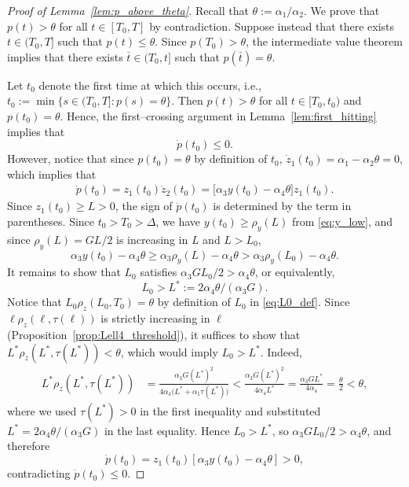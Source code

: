 \documentclass{article}
\begin{document}
\begin{proof}[Proof of Lemma~\ref{lem:p_above_theta}]
    Recall that $\theta:=\alpha_1/\alpha_2$. We prove that $p(t)>\theta$ for all $t\in[T_0,T]$
    by contradiction. Suppose instead that there exists $t\in(T_0,T]$ such that $p(t)\le\theta.$
    Since $p(T_0)>\theta$, the
    intermediate value theorem implies that there exists $\bar{t}\in(T_0,t]$ such that $p(\bar{t})=\theta$.
    
    Let $t_0$ denote the first time at which this occurs, i.e., $t_0:=\min\{s\in(T_0,T]:p(s)=\theta\}.$
    Then $p(t)>\theta$ for all $t\in[T_0,t_0)$ and $p(t_0)=\theta$. Hence, the first--crossing argument in Lemma~\ref{lem:first_hitting} implies that
    \begin{equation*}
        \dot p(t_0)\le 0.
    \end{equation*}
    However, notice that since $p(t_0)=\theta$ by definition of $t_0$, $\dot z_1(t_0)=\alpha_1-\alpha_2\theta=0$, which implies that 
    \begin{align*}
        \dot p(t_0) = z_1(t_0)\dot z_2(t_0) = \bigl[\alpha_3 y(t_0)-\alpha_4\theta\bigr]z_1(t_0).
    \end{align*}
    Since $z_1(t_0) \ge L > 0$, the sign of $\dot p(t_0)$ is determined by the term in parentheses. Since $t_0>T_0>\Delta$, we have $y(t_0)\ge\rho_y(L)$ from \eqref{eq:y_low}, and since $\rho_y(L)=GL/2$ is increasing in $L$ and $L>L_0$,
    \begin{equation*}
        \alpha_3 y(t_0)-\alpha_4\theta 
        \ge \alpha_3\rho_y(L)-\alpha_4\theta
        > \alpha_3\rho_y(L_0)-\alpha_4\theta.
    \end{equation*}
    It remains to show that $L_0$ satisfies $\alpha_3 GL_0/2>\alpha_4\theta$, 
    or equivalently, 
    \begin{equation*}
        L_0>L^*:=2\alpha_4\theta/(\alpha_3 G).
    \end{equation*}
    Notice that $L_0\rho_z(L_0,T_0) = \theta$
    by definition of $L_0$ in \eqref{eq:L0_def}. Since $\ell\rho_z(\ell,\tau(\ell))$ is strictly 
    increasing in $\ell$ (Proposition~\ref{prop:Lell4_threshold}), it suffices to show that
    $L^*\rho_z(L^*,\tau(L^*))<\theta$, which would imply $L_0>L^*$. Indeed,
    \begin{align*}
        L^*\rho_z(L^*,\tau(L^*))
        &= \frac{\alpha_3 G(L^*)^2}{4\alpha_4\bigl(L^*+\alpha_1\tau(L^*)\bigr)}
        < \frac{\alpha_3 G(L^*)^2}{4\alpha_4 L^*}
        = \frac{\alpha_3 G L^*}{4\alpha_4}
        = \frac{\theta}{2}
        < \theta,
    \end{align*}
    where we used $\tau(L^*)>0$ in the first inequality and substituted 
    $L^*=2\alpha_4\theta/(\alpha_3 G)$ in the last equality.
    Hence $L_0>L^*$, so $\alpha_3GL_0/2>\alpha_4\theta$, and 
    therefore
    \begin{equation*}
        \dot p(t_0)=z_1(t_0)\left[\alpha_3 y(t_0)-\alpha_4\theta\right]>0,
    \end{equation*}
    contradicting $\dot p(t_0)\le 0$.
\end{proof}
\end{document}
